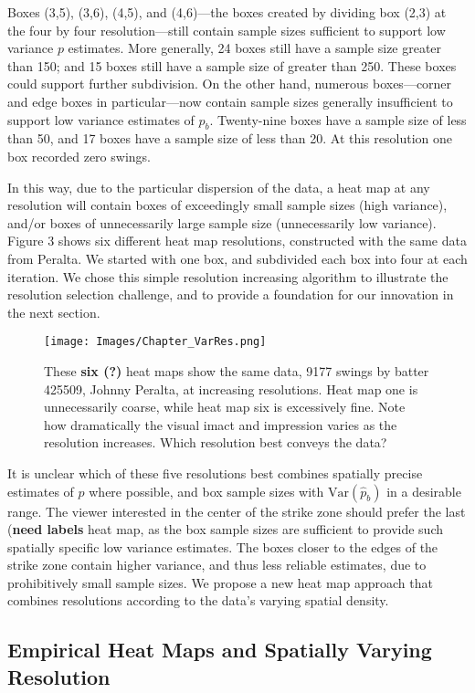 \documentclass{article}
\begin{document}
Boxes (3,5), (3,6), (4,5), and (4,6)---the boxes created by dividing box (2,3) at the four by four resolution---still contain sample sizes sufficient to support low variance $p$ estimates. More generally, 24 boxes still have a sample size greater than 150; and 15 boxes still have a sample size of greater than 250. These boxes could support further subdivision. On the other hand, numerous boxes---corner and edge boxes in particular---now contain sample sizes generally insufficient to support low variance estimates of $p_{b}$. Twenty-nine boxes have a sample size of less than 50, and 17 boxes have a sample size of less than 20. At this resolution one box recorded zero swings.

In this way, due to the particular dispersion of the data, a heat map at any resolution will contain boxes of exceedingly small sample sizes (high variance), and/or boxes of unnecessarily large sample size (unnecessarily low variance). Figure 3 shows six different heat map resolutions, constructed with the same data from Peralta. We started with one box, and subdivided each box into four at each iteration. We chose this simple resolution increasing algorithm to illustrate the resolution selection challenge, and to provide a foundation for our innovation in the next section. 
        \begin{figure}[H]
      	\centering
      	\texttt{[image: Images/Chapter\_VarRes.png]} 
      	\caption{These {\bf six (?)} heat maps show the same data, 9177 swings by batter 425509, Johnny Peralta, at increasing resolutions. Heat map one is unnecessarily coarse, while heat map six is excessively fine. Note how dramatically the visual imact and impression varies as the resolution increases. Which resolution best conveys the data?}
      	\end{figure} 

It is unclear which of these five resolutions best combines spatially precise estimates of $p$ where possible, and box sample sizes with $\text{Var}(\hat{p}_{b})$ in a desirable range. The viewer interested in the center of the strike zone should prefer the last ({\bf need labels} heat map, as the box sample sizes are sufficient to provide such spatially specific low variance estimates. The boxes closer to the edges of the strike zone contain higher variance, and thus less reliable estimates, due to prohibitively small sample sizes. We propose a new heat map approach that combines resolutions according to the data's varying spatial density.

\subsection{Empirical Heat Maps and Spatially Varying Resolution} %
\end{document}
